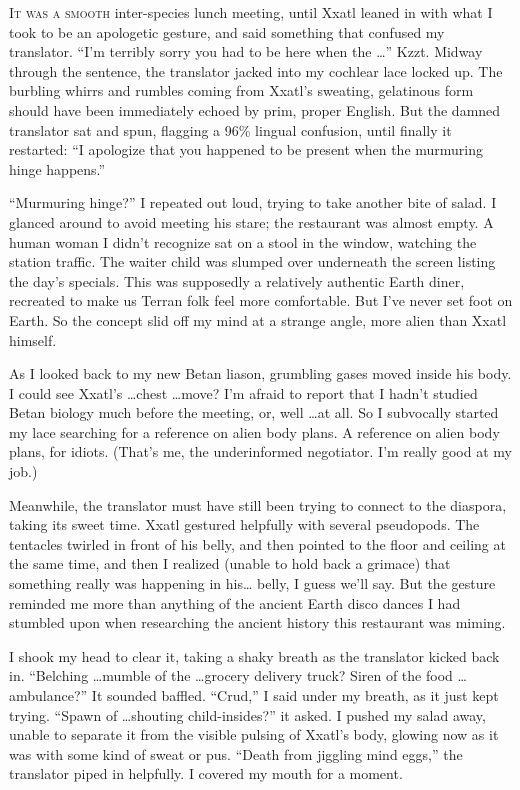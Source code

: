 
\lettrine{I}{t was a smooth} inter-species lunch meeting, until Xxatl leaned in with
what I took to be an apologetic gesture, and said something that
confused my translator. ``I'm terribly sorry you had to be here when
the \ldots'' Kzzt. Midway through the sentence, the translator jacked into
my cochlear lace locked up. The burbling whirrs and rumbles coming from
Xxatl's sweating, gelatinous form should have been immediately echoed by
prim, proper English. But the damned translator sat and spun, flagging a
96\% lingual confusion, until finally it restarted: ``I apologize that
you happened to be present when the murmuring hinge happens.''

``Murmuring hinge?'' I repeated out loud, trying to take another bite of
salad. I glanced around to avoid meeting his stare; the restaurant was
almost empty. A human woman I didn't recognize sat on a stool in the
window, watching the station traffic. The waiter child was slumped over
underneath the screen listing the day's specials. This was supposedly a
relatively authentic Earth diner, recreated to make us Terran folk feel
more comfortable. But I've never set foot on Earth. So the concept slid
off my mind at a strange angle, more alien than Xxatl himself.

As I looked back to my new Betan liason, grumbling gases moved inside
his body. I could see Xxatl's \ldots chest \ldots move? I'm afraid to
report that I hadn't studied Betan biology much before the meeting, or,
well \ldots at all. So I subvocally started my lace searching for a
reference on alien body plans. A reference on alien body plans, for
idiots. (That's me, the underinformed negotiator. I'm really good at my
job.)

Meanwhile, the translator must have still been trying to connect to the
diaspora, taking its sweet time. Xxatl gestured helpfully with several
pseudopods. The tentacles twirled in front of his belly, and then
pointed to the floor and ceiling at the same time, and then I realized
(unable to hold back a grimace) that something really was happening in
his\ldots{} belly, I guess we'll say. But the gesture reminded me more
than anything of the ancient Earth disco dances I had stumbled upon when
researching the ancient history this restaurant was miming.

I shook my head to clear it, taking a shaky breath as the translator
kicked back in. ``Belching \ldots mumble of the \ldots grocery delivery truck?
Siren of the food \ldots ambulance?'' It sounded baffled. ``Crud,'' I said
under my breath, as it just kept trying. ``Spawn of \dots shouting
child-insides?'' it asked. I pushed my salad away, unable to separate it
from the visible pulsing of Xxatl's body, glowing now as it was with
some kind of sweat or pus. ``Death from jiggling mind eggs,'' the
translator piped in helpfully. I covered my mouth for a moment.


